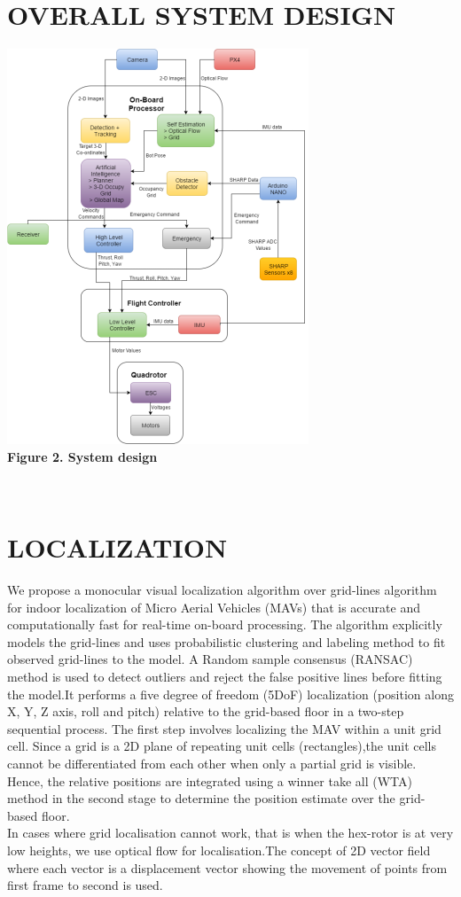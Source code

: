 \documentclass[12pt]{article}
\begin{document}
\section{OVERALL SYSTEM DESIGN}
\begin{center}\includegraphics[scale=0.5]{image22} \\
\textbf{Figure 2. System design}\end{center} \\

\section{LOCALIZATION}
We propose a monocular visual localization algorithm over grid-lines algorithm for indoor  localization  of  Micro  Aerial Vehicles  (MAVs)  that  is  accurate  and  computationally  fast for  real-time  on-board  processing. The algorithm  explicitly models  the  grid-lines  and  uses  probabilistic  clustering  and labeling  method  to  fit  observed  grid-lines  to  the  model.  A Random sample consensus (RANSAC) method is used to detect outliers and reject the false positive lines before fitting the model.It performs a five degree of freedom (5DoF) localization (position along X, Y, Z axis, roll and pitch) relative to  the  grid-based  floor  in  a  two-step  sequential  process.  The first step involves localizing the MAV within a unit grid cell. Since a grid is a 2D plane of repeating unit cells (rectangles),the  unit  cells  cannot  be  differentiated  from  each  other  when only a partial grid is visible. Hence, the relative positions are integrated using a winner take all (WTA) method in the second stage  to  determine  the  position  estimate  over  the  grid-based floor.\\
In cases where grid localisation cannot work, that is when the hex-rotor is at very low heights, we use optical flow for localisation.The concept of 2D vector field where each vector is a displacement vector showing the movement of points from first frame to second is used.
\end{document}
